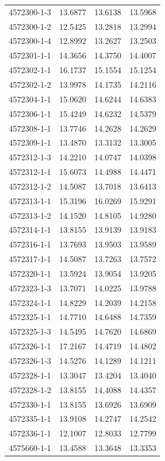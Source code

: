 \begin{longtable}{lrrr}
4572300-1-3 & 13.6877 & 13.6138 & 13.5968 \\
4572300-1-2 & 12.5425 & 13.2818 & 13.2994 \\
4572300-1-4 & 12.8992 & 13.2627 & 13.2503 \\
4572301-1-1 & 14.3656 & 14.3750 & 14.4007 \\
4572302-1-1 & 16.1737 & 15.1554 & 15.1254 \\
4572302-1-2 & 13.9978 & 14.1735 & 14.2116 \\
4572304-1-1 & 15.0620 & 14.6244 & 14.6383 \\
4572306-1-1 & 15.4249 & 14.6232 & 14.5379 \\
4572308-1-1 & 13.7746 & 14.2628 & 14.2629 \\
4572309-1-1 & 13.4870 & 13.3132 & 13.3005 \\
4572312-1-3 & 14.2210 & 14.0747 & 14.0398 \\
4572312-1-1 & 15.6073 & 14.4988 & 14.4471 \\
4572312-1-2 & 14.5087 & 13.7018 & 13.6413 \\
4572313-1-1 & 15.3196 & 16.0269 & 15.9291 \\
4572313-1-2 & 14.1520 & 14.8105 & 14.9280 \\
4572314-1-1 & 13.8155 & 13.9139 & 13.9183 \\
4572316-1-1 & 13.7693 & 13.9503 & 13.9589 \\
4572317-1-1 & 14.5087 & 13.7263 & 13.7572 \\
4572320-1-1 & 13.5924 & 13.9054 & 13.9205 \\
4572323-1-3 & 13.7071 & 14.0225 & 13.9788 \\
4572324-1-1 & 14.8229 & 14.2039 & 14.2158 \\
4572325-1-1 & 14.7710 & 14.6488 & 14.7359 \\
4572325-1-3 & 14.5495 & 14.7620 & 14.6869 \\
4572326-1-1 & 17.2167 & 14.4719 & 14.4802 \\
4572326-1-3 & 14.5276 & 14.1289 & 14.1211 \\
4572328-1-1 & 13.3047 & 13.4204 & 13.4040 \\
4572328-1-2 & 13.8155 & 14.4088 & 14.4357 \\
4572330-1-1 & 13.8155 & 13.6926 & 13.6909 \\
4572335-1-1 & 13.9108 & 14.2747 & 14.2542 \\
4572336-1-1 & 12.1007 & 12.8033 & 12.7799 \\
4575660-1-1 & 13.4588 & 13.3648 & 13.3353 \\

\end{longtable}
